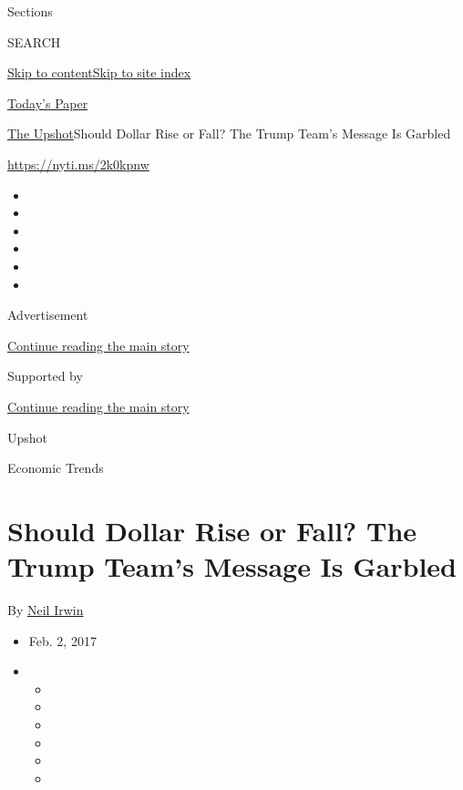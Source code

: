 Sections

SEARCH

\protect\hyperlink{site-content}{Skip to
content}\protect\hyperlink{site-index}{Skip to site index}

\href{https://myaccount.nytimes.com/auth/login?response_type=cookie\&client_id=vi}{}

\href{https://www.nytimes.com/section/todayspaper}{Today's Paper}

\href{/section/upshot}{The Upshot}\textbar{}Should Dollar Rise or Fall?
The Trump Team's Message Is Garbled

\url{https://nyti.ms/2k0kpnw}

\begin{itemize}
\item
\item
\item
\item
\item
\item
\end{itemize}

Advertisement

\protect\hyperlink{after-top}{Continue reading the main story}

Supported by

\protect\hyperlink{after-sponsor}{Continue reading the main story}

Upshot

Economic Trends

\hypertarget{should-dollar-rise-or-fall-the-trump-teams-message-is-garbled}{%
\section{Should Dollar Rise or Fall? The Trump Team's Message Is
Garbled}\label{should-dollar-rise-or-fall-the-trump-teams-message-is-garbled}}

By \href{http://www.nytimes.com/by/neil-irwin}{Neil Irwin}

\begin{itemize}
\item
  Feb. 2, 2017
\item
  \begin{itemize}
  \item
  \item
  \item
  \item
  \item
  \item
  \end{itemize}
\end{itemize}


